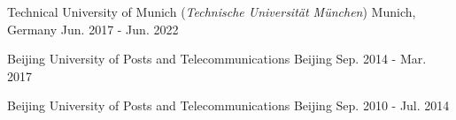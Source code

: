 



\begin{cventries}

{Technical University of Munich (\textit{Technische Universität München})} %
{Munich, Germany} %
{Jun. 2017 - Jun. 2022} %


{Beijing University of Posts and Telecommunications} %
{Beijing} %
{Sep. 2014 - Mar. 2017} %


{Beijing University of Posts and Telecommunications} %
{Beijing} %
{Sep. 2010 - Jul. 2014} %

\end{cventries}
